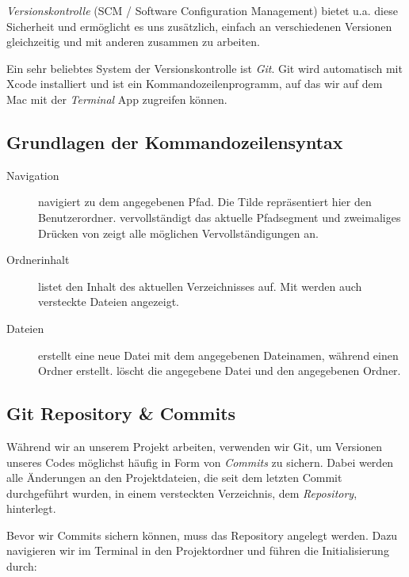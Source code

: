 \documentclass[parskip=half, final]{scrreprt}
\begin{document}

\emph{Versionskontrolle} (SCM / Software Configuration Management) bietet u.a. diese Sicherheit und ermöglicht es uns zusätzlich, einfach an verschiedenen Versionen gleichzeitig und mit anderen zusammen zu arbeiten.

Ein sehr beliebtes System der Versionskontrolle ist \emph{Git}. Git wird automatisch mit Xcode installiert und ist ein Kommandozeilenprogramm, auf das wir auf dem Mac mit der \emph{Terminal} App zugreifen können.

\subsection{Grundlagen der Kommandozeilensyntax}
\begin{description}
\item[Navigation]  navigiert zu dem angegebenen Pfad. Die Tilde \shinline{~} repräsentiert hier den Benutzerordner. \keys{\tab} vervollständigt das aktuelle Pfadsegment und zweimaliges Drücken von \keys{\tab} zeigt alle möglichen Vervollständigungen an.
\item[Ordnerinhalt]  listet den Inhalt des aktuellen Verzeichnisses auf. Mit  werden auch versteckte Dateien angezeigt.
\item[Dateien]  erstellt eine neue Datei mit dem angegebenen Dateinamen, während  einen Ordner erstellt.  löscht die angegebene Datei und  den angegebenen Ordner.
\end{description}

\subsection{Git Repository \& Commits}
 
Während wir an unserem Projekt arbeiten, verwenden wir Git, um Versionen unseres Codes möglichst häufig in Form von \emph{Commits} zu sichern. Dabei werden alle Änderungen an den Projektdateien, die seit dem letzten Commit durchgeführt wurden, in einem versteckten  Verzeichnis, dem \emph{Repository}, hinterlegt.

Bevor wir Commits sichern können, muss das Repository angelegt werden. Dazu navigieren wir im Terminal in den Projektordner und führen die Initialisierung durch:
\end{document}
